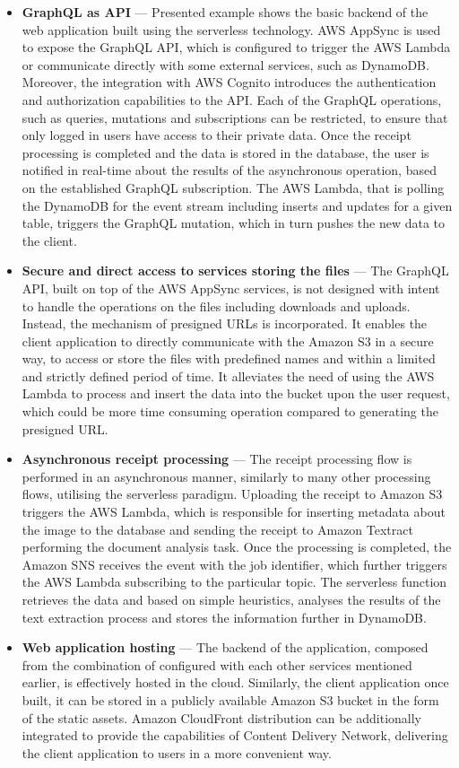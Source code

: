 \begin{itemize}
    \item \textbf{GraphQL as API} --- Presented example shows the basic backend of the web application built using the serverless technology. AWS AppSync is used to expose the GraphQL API, which is configured to trigger the AWS Lambda or communicate directly with some external services, such as DynamoDB. Moreover, the integration with AWS Cognito introduces the authentication and authorization capabilities to the API. Each of the GraphQL operations, such as queries, mutations and subscriptions can be restricted, to ensure that only logged in users have access to their private data. Once the receipt processing is completed and the data is stored in the database, the user is notified in real-time about the results of the asynchronous operation, based on the established GraphQL subscription. The AWS Lambda, that is polling the DynamoDB for the event stream including inserts and updates for a given table, triggers the GraphQL mutation, which in turn pushes the new data to the client.
    \item \textbf{Secure and direct access to services storing the files} --- The GraphQL API, built on top of the AWS AppSync services, is not designed with intent to handle the operations on the files including downloads and uploads. Instead, the mechanism of presigned URLs is incorporated. It enables the client application to directly communicate with the Amazon S3 in a secure way, to access or store the files with predefined names and within a limited and strictly defined period of time. It alleviates the need of using the AWS Lambda to process and insert the data into the bucket upon the user request, which could be more time consuming operation compared to generating the presigned URL.
    \item \textbf{Asynchronous receipt processing} --- The receipt processing flow is performed in an asynchronous manner, similarly to many other processing flows, utilising the serverless paradigm. Uploading the receipt to Amazon S3 triggers the AWS Lambda, which is responsible for inserting metadata about the image to the database and sending the receipt to Amazon Textract performing the document analysis task. Once the processing is completed, the Amazon SNS receives the event with the job identifier, which further triggers the AWS Lambda subscribing to the particular topic. The serverless function retrieves the data and based on simple heuristics, analyses the results of the text extraction process and stores the information further in DynamoDB.
    \item \textbf{Web application hosting} --- The backend of the application, composed from the combination of configured with each other services mentioned earlier, is effectively hosted in the cloud. Similarly, the client application once built, it can be stored in a publicly available Amazon S3 bucket in the form of the static assets. Amazon CloudFront distribution can be additionally integrated to provide the capabilities of Content Delivery Network, delivering the client application to users in a more convenient way.
\end{itemize}

